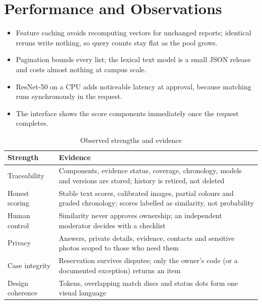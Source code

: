 \documentclass[12pt,a4paper,oneside]{report}
\begin{document}
\section{Performance and Observations}
\begin{itemize}
  \item Feature caching avoids recomputing vectors for unchanged reports; identical reruns write nothing, so query counts stay flat as the pool grows.
  \item Pagination bounds every list; the lexical text model is a small JSON release and costs almost nothing at campus scale.
  \item ResNet-50 on a CPU adds noticeable latency at approval, because matching runs synchronously in the request.
  \item The interface shows the score components immediately once the request completes.
\end{itemize}
\begin{table}[H]
\centering\small
\caption{Observed strengths and evidence}
\begin{tabularx}{\textwidth}{P{32mm}X}
\toprule
Strength & Evidence\\
\midrule
Traceability & Components, evidence status, coverage, chronology, models and versions are stored; history is retired, not deleted\\
Honest scoring & Stable text scores, calibrated images, partial colours and graded chronology; scores labelled as similarity, not probability\\
Human control & Similarity never approves ownership; an independent moderator decides with a checklist\\
Privacy & Answers, private details, evidence, contacts and sensitive photos scoped to those who need them\\
Case integrity & Reservation survives disputes; only the owner's code (or a documented exception) returns an item\\
Design coherence & Tokens, overlapping match discs and status dots form one visual language\\
\bottomrule
\end{tabularx}
\end{table}
\end{document}
